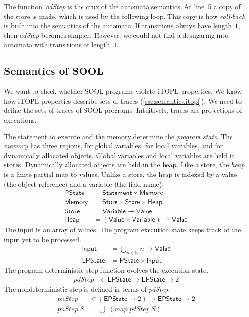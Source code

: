 \documentclass[preprint]{sigplanconf} %
\newcommand{\N}{\ensuremath{\mathbb{N}}}
\newcommand{\pmap}{\rightharpoonup}
\newcommand{\set}[1]{\ensuremath{\mathsf{#1}}}
\theoremstyle{definition}
\theoremstyle{remark}
\begin{document}
The function~\textit{adStep} is the crux of the automata semantics.
At line~5 a copy of the store is made, which is used by the following loop.
This copy is how \emph{roll-back} is built into the semantics of the automata.
If transitions always have length~$1$, then \textit{adStep} becomes simpler.
However, we could not find a desugaring into automata with transitions of length~$1$.

\subsection{Semantics of SOOL} \label{sec:semantics.sool} %


We want to check whether SOOL programs violate iTOPL properties.
We know how iTOPL properties describe sets of traces (\autoref{sec:semantics.itopl}).
We need to define the sets of traces of SOOL programs.
Intuitively, traces are projections of executions.

The statement to execute and the memory determine the \emph{program state}.
The \emph{memory} has three regions, for global variables, for local variables, and for dynamically allocated objects.
Global variables and local variables are held in stores.
Dynamically allocated objects are held in the heap.
Like a store, the \emph{heap} is a finite partial map to values.
Unlike a store, the heap is indexed by a value (the object reference) and a variable (the field name).
\begin{align}
\set{PState}&=\set{Statement}\times\set{Memory} \label{eq:pstate}\\
\set{Memory}&=\set{Store}\times\set{Store}\times\set{Heap}\\
\set{Store}&=\set{Variable}\pmap\set{Value} \\
\set{Heap}&=(\set{Value}\times\set{Variable})\pmap\set{Value}
\end{align}
The input is an array of values.
The program execution state keeps track of the input yet to be processed.
\begin{align}
\set{Input}&=\bigcup_{n\in\N}n\to\set{Value} \label{eq:input}\\
\set{EPState}&=\set{PState}\times\set{Input} \label{eq:epstate}
\end{align}
The program deterministic step function evolves the execution state.
\begin{align}
\mathit{pdStep}&\in\set{EPState}\to\set{EPState}\to2 \label{eq:pdstep}
\end{align}
The nondeterministic step is defined in terms of \textit{pdStep}.
\begin{align}
\mathit{pnStep}&\in(\set{EPState}\to2)\to\set{EPState}\to2 \\
\mathit{pnStep}\;S&=\bigcup\;(\mathit{map}\;\mathit{pdStep}\;S) \label{eq:pnstep}
\end{align}
\end{document}
